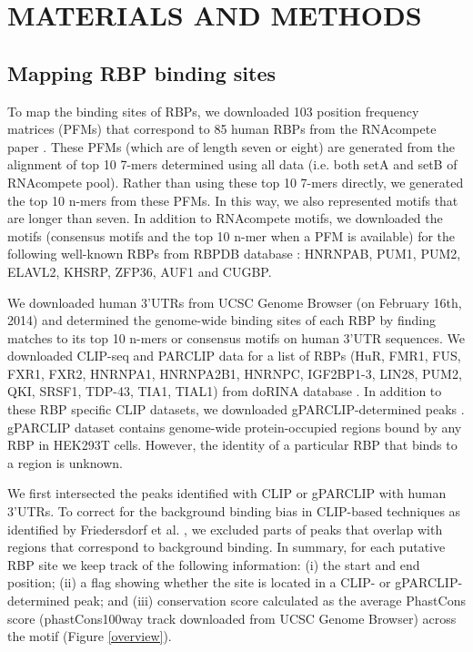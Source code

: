 \chapter{MATERIALS AND METHODS}
\label{chp:chapter3}

\section{Mapping RBP binding sites}
To map the binding sites of RBPs, we downloaded 103 position frequency matrices (PFMs) that correspond to 85 human RBPs from the RNAcompete paper \cite{rnacompete_13}. These PFMs (which are of length seven or eight) are generated from the alignment of top 10 7-mers determined using all data (i.e. both setA and setB of RNAcompete pool). Rather than using these top 10 7-mers directly, we generated the top 10 n-mers from these PFMs. In this way, we also represented motifs that are longer than seven. In addition to RNAcompete motifs, we downloaded the motifs (consensus motifs and the top 10 n-mer when a PFM is available) for the following well-known RBPs from RBPDB database \cite{rbpdb_11}: HNRNPAB, PUM1, PUM2, ELAVL2, KHSRP, ZFP36, AUF1 and CUGBP. 

We downloaded human 3'UTRs from UCSC Genome Browser (on February 16th, 2014) and determined the genome-wide binding sites of each RBP by finding matches to its top 10 n-mers or consensus motifs on human 3'UTR sequences. We downloaded CLIP-seq and PARCLIP data for a list of RBPs (HuR, FMR1, FUS, FXR1, FXR2, HNRNPA1, HNRNPA2B1, HNRNPC, IGF2BP1-3, LIN28, PUM2, QKI, SRSF1, TDP-43, TIA1, TIAL1) from doRINA database \cite{dorina_11}. In addition to these RBP specific CLIP datasets, we downloaded gPARCLIP-determined peaks \cite{baltz_12}. gPARCLIP dataset contains genome-wide protein-occupied regions bound by any RBP in HEK293T cells. However, the identity of a particular RBP that binds to a region is unknown. 

We first intersected the peaks identified with CLIP or gPARCLIP  with human 3'UTRs. To correct for the background binding bias in CLIP-based techniques as identified by Friedersdorf et al. \cite{friedersdorf_14}, we excluded parts of peaks that overlap with regions that correspond to background binding. In summary, for each putative RBP site we keep track of the following information: (i) the start and end position; (ii) a flag showing whether the site is located in a CLIP- or gPARCLIP-determined peak; and (iii) conservation score calculated as the average PhastCons score \cite{siepel_05} (phastCons100way track downloaded from UCSC Genome Browser) across the motif (Figure \ref{overview}).

